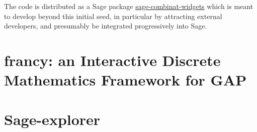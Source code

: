 \documentclass{deliverablereport}
\begin{document}




The code is distributed as a Sage package
\href{https://github.com/sagemath/sage-combinat-widgets/}{sage-combinat-widgets}
which is meant to develop beyond this initial seed, in particular by
attracting external developers, and presumably be integrated
progressively into Sage.


\section{francy: an Interactive Discrete Mathematics Framework for GAP}



\section{Sage-explorer}
\label{sage-explorer}
\end{document}
